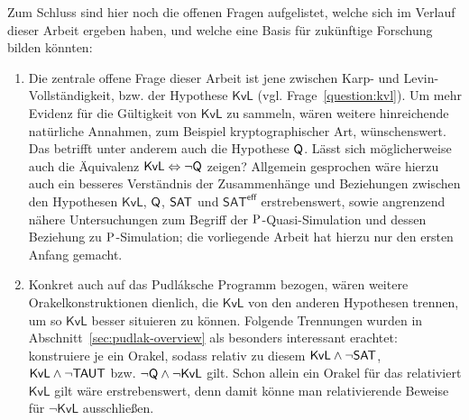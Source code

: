Zum Schluss sind hier noch die offenen Fragen aufgelistet, welche sich im Verlauf dieser Arbeit ergeben haben, und welche eine Basis für zukünftige Forschung bilden könnten:
\begin{enumerate}[label=\arabic*.,midpenalty=0]
    \item Die zentrale offene Frage dieser Arbeit ist jene zwischen Karp- und Levin-Vollständigkeit, bzw. der Hypothese $\mathsf{KvL}$ (vgl. Frage~\ref{question:kvl}). Um mehr Evidenz für die Gültigkeit von $\mathsf{KvL}$ zu sammeln, wären weitere hinreichende natürliche Annahmen, zum Beispiel kryptographischer Art, wünschenswert.
        Das betrifft unter anderem auch die Hypothese $\hQ$. Lässt sich möglicherweise auch die Äquivalenz $\mathsf{KvL}\Leftrightarrow \neg\hQ$ zeigen?
        Allgemein gesprochen wäre hierzu auch ein besseres Verständnis der Zusammenhänge und Beziehungen zwischen den Hypothesen $\mathsf{KvL}$, $\hQ$, $\hSAT$ und $\mathsf{SAT^{eff}}$ erstrebenswert, sowie angrenzend nähere Untersuchungen zum Begriff der $\P$-Quasi-Simulation und dessen Beziehung zu $\P$-Simulation; die vorliegende Arbeit hat hierzu nur den ersten Anfang gemacht.

    \item Konkret auch auf das Pudláksche Programm bezogen, wären weitere Orakelkonstruktionen dienlich, die $\mathsf{KvL}$ von den anderen Hypothesen trennen, um so $\mathsf{KvL}$ besser situieren zu können. Folgende Trennungen wurden in Abschnitt~\ref{sec:pudlak-overview} als besonders interessant erachtet: konstruiere je ein Orakel, sodass relativ zu diesem $\mathsf{KvL}\land\neg\hSAT$, $\mathsf{KvL}\land\neg\hTAUT$ bzw. $\neg\hQ\land\neg\mathsf{KvL}$ gilt.
        Schon allein ein Orakel für das relativiert $\mathsf{KvL}$ gilt wäre erstrebenswert, denn damit könne man relativierende Beweise für $\neg\mathsf{KvL}$ ausschließen.



\end{enumerate}
